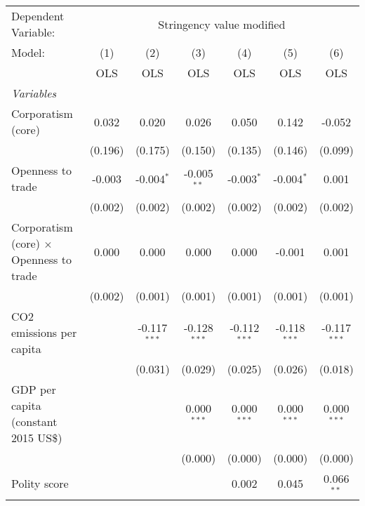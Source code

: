 
\begingroup
\centering
\begin{tabular}{lcccccc}
   \toprule
   Dependent Variable: & \multicolumn{6}{c}{Stringency value modified}\\
   Model:                                         & (1)     & (2)            & (3)            & (4)            & (5)            & (6)\\  
                                                  &  OLS    & OLS            & OLS            & OLS            & OLS            & OLS\\  
   \midrule
   \emph{Variables}\\
   Corporatism (core)                             & 0.032   & 0.020          & 0.026          & 0.050          & 0.142          & -0.052\\   
                                                  & (0.196) & (0.175)        & (0.150)        & (0.135)        & (0.146)        & (0.099)\\   
   Openness to trade                              & -0.003  & -0.004$^{*}$   & -0.005$^{**}$  & -0.003$^{*}$   & -0.004$^{*}$   & 0.001\\   
                                                  & (0.002) & (0.002)        & (0.002)        & (0.002)        & (0.002)        & (0.002)\\   
   Corporatism (core) $\times$ Openness to trade  & 0.000   & 0.000          & 0.000          & 0.000          & -0.001         & 0.001\\   
                                                  & (0.002) & (0.001)        & (0.001)        & (0.001)        & (0.001)        & (0.001)\\   
   CO2 emissions per capita                       &         & -0.117$^{***}$ & -0.128$^{***}$ & -0.112$^{***}$ & -0.118$^{***}$ & -0.117$^{***}$\\   
                                                  &         & (0.031)        & (0.029)        & (0.025)        & (0.026)        & (0.018)\\   
   GDP per capita (constant 2015 US\$)            &         &                & 0.000$^{***}$  & 0.000$^{***}$  & 0.000$^{***}$  & 0.000$^{***}$\\   
                                                  &         &                & (0.000)        & (0.000)        & (0.000)        & (0.000)\\   
   Polity score                                   &         &                &                & 0.002          & 0.045          & 0.066$^{**}$\\   

\end{tabular}
